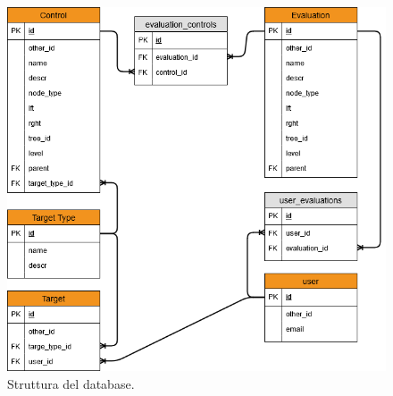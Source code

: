 \begin{figure}[ht!]
    \centering
    \includegraphics[scale=0.6]{images/MoonCloudRecommendation_ER.png}
    \caption{Struttura del database.}
    \label{fig:str_db_project}
\end{figure}
%
\newpage
%
